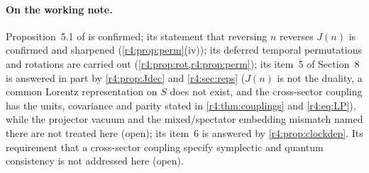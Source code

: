 \paragraph{On the working note.} Proposition~5.1 of \cite{FMB} is confirmed; its statement that reversing $n$ reverses $J(n)$ is confirmed and
sharpened (\cref{r4:prop:perm}(iv)); its deferred temporal permutations and rotations are carried out (\cref{r4:prop:rot,r4:prop:perm}); its item~5 of
Section~8 is answered in part by \cref{r4:prop:Jdec} and \cref{r4:sec:reps} ($J(n)$ is not the duality, a common Lorentz representation on $S$ does not exist,
and the cross-sector coupling has the units, covariance and parity stated in \cref{r4:thm:couplings} and \cref{r4:eq:LP}), while the projector vacuum and
the mixed/spectator embedding mismatch named there are not treated here (open); its item~6 is answered by \cref{r4:prop:clockdep}.
Its requirement that a cross-sector coupling specify symplectic and quantum consistency is not addressed here (open).

